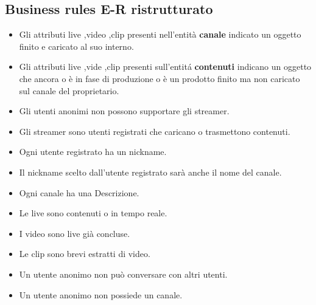 \subsection{Business rules E-R ristrutturato }
\begin{itemize}
    \item Gli attributi live ,video ,clip presenti nell'entità \textbf{canale} indicato un oggetto finito e caricato al suo interno.
    \item Gli attributi live ,vide ,clip presenti sull'entitá \textbf{contenuti} indicano un oggetto che ancora o è in fase di produzione o è un prodotto finito ma non caricato sul canale del proprietario. 
    \item Gli utenti anonimi non possono supportare gli streamer. 
    \item Gli streamer sono utenti registrati che caricano  o trasmettono contenuti. 
    \item Ogni utente registrato ha un nickname. 
    \item Il nickname scelto dall'utente registrato sarà anche il nome del canale. 
    \item Ogni canale ha una Descrizione. 
    \item Le live sono contenuti o in tempo reale.
    \item I video sono live già concluse. 
    \item Le clip sono brevi estratti di video. 
    \item Un utente anonimo non può conversare con altri utenti.
    \item Un utente anonimo non possiede un canale. 
\end{itemize}
